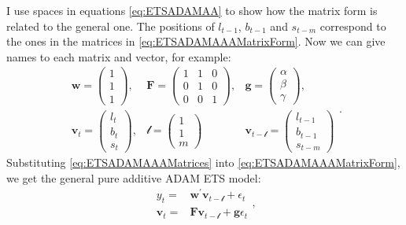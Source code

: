 \documentclass[
]{book}
\theoremstyle{definition}
\theoremstyle{definition}
\theoremstyle{definition}
\theoremstyle{definition}
\theoremstyle{remark}
\begin{document}
I use spaces in equations \eqref{eq:ETSADAMAA} to show how the matrix form is related to the general one. The positions of \(l_{t-1}\), \(b_{t-1}\) and \(s_{t-m}\) correspond to the ones in the matrices in \eqref{eq:ETSADAMAAAMatrixForm}. Now we can give names to each matrix and vector, for example:
\begin{equation}
  \begin{aligned}
    \mathbf{w} = \begin{pmatrix} 1 \\ 1 \\ 1 \end{pmatrix}, & \mathbf{F} = \begin{pmatrix} 1 & 1 & 0 \\ 0 & 1 & 0 \\ 0 & 0 & 1 \end{pmatrix}, & \mathbf{g} = \begin{pmatrix} \alpha \\ \beta \\ \gamma \end{pmatrix}, \\
    \mathbf{v}_{t} = \begin{pmatrix} l_t \\ b_t \\ s_t \end{pmatrix}, & \boldsymbol{\mathscr{l}} = \begin{pmatrix} 1 \\ 1 \\ m \end{pmatrix} & \mathbf{v}_{t-\boldsymbol{\mathscr{l}}} = \begin{pmatrix} l_{t-1} \\ b_{t-1} \\ s_{t-m} \end{pmatrix}
  \end{aligned}.
  \label{eq:ETSADAMAAAMatrices}
\end{equation}
Substituting \eqref{eq:ETSADAMAAAMatrices} into \eqref{eq:ETSADAMAAAMatrixForm}, we get the general pure additive ADAM ETS model:
\begin{equation}
  \begin{aligned}
    {y}_{t} = &\mathbf{w}^\prime \mathbf{v}_{t-\boldsymbol{\mathscr{l}}} + \epsilon_t \\
    \mathbf{v}_{t} = &\mathbf{F} \mathbf{v}_{t-\boldsymbol{\mathscr{l}}} + \mathbf{g} \epsilon_t
  \end{aligned},
  \label{eq:ETSADAMStateSpacePureAdditive}
\end{equation}
\end{document}
